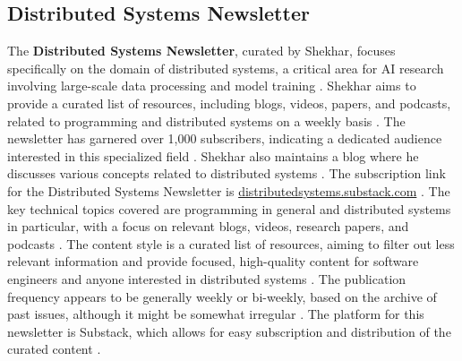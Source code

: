 \documentclass[11pt]{article}
\begin{document}
\subsection{Distributed Systems Newsletter}
The \textbf{Distributed Systems Newsletter}, curated by Shekhar, focuses specifically on the domain of distributed systems, a critical area for AI research involving large-scale data processing and model training \citep{shekhar2025distributedsystems}. Shekhar aims to provide a curated list of resources, including blogs, videos, papers, and podcasts, related to programming and distributed systems on a weekly basis \citep{shekhar2025about}. The newsletter has garnered over 1,000 subscribers, indicating a dedicated audience interested in this specialized field \citep{shekhar2025distributedsystems}. Shekhar also maintains a blog where he discusses various concepts related to distributed systems \citep{shekhar2019intro}. The subscription link for the Distributed Systems Newsletter is \url{distributedsystems.substack.com} \citep{shekhar2025distributedsystems}. The key technical topics covered are programming in general and distributed systems in particular, with a focus on relevant blogs, videos, research papers, and podcasts \citep{shekhar2025distributedsystems}. The content style is a curated list of resources, aiming to filter out less relevant information and provide focused, high-quality content for software engineers and anyone interested in distributed systems \citep{shekhar2025distributedsystems}. The publication frequency appears to be generally weekly or bi-weekly, based on the archive of past issues, although it might be somewhat irregular \citep{shekhar2025distributedsystems}. The platform for this newsletter is Substack, which allows for easy subscription and distribution of the curated content \citep{shekhar2025distributedsystems}.
\end{document}
